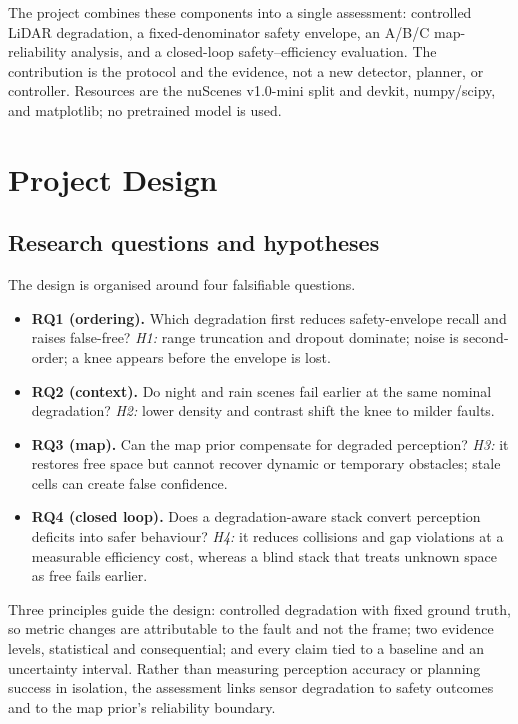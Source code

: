 \documentclass[10pt,a4paper]{article}
\begin{document}
The project combines these components into a single assessment: controlled LiDAR degradation, a fixed-denominator safety envelope, an A/B/C map-reliability analysis, and a closed-loop safety--efficiency evaluation. The contribution is the protocol and the evidence, not a new detector, planner, or controller. Resources are the nuScenes v1.0-mini split and devkit, numpy/scipy, and matplotlib; no pretrained model is used.

\newpage
\suppressfloats[t]
\section{Project Design}

\subsection{Research questions and hypotheses}

The design is organised around four falsifiable questions.

\begin{itemize}
  \item \textbf{RQ1 (ordering).} Which degradation first reduces safety-envelope recall and raises false-free? \emph{H1:} range truncation and dropout dominate; noise is second-order; a knee appears before the envelope is lost.
  \item \textbf{RQ2 (context).} Do night and rain scenes fail earlier at the same nominal degradation? \emph{H2:} lower density and contrast shift the knee to milder faults.
  \item \textbf{RQ3 (map).} Can the map prior compensate for degraded perception? \emph{H3:} it restores free space but cannot recover dynamic or temporary obstacles; stale cells can create false confidence.
  \item \textbf{RQ4 (closed loop).} Does a degradation-aware stack convert perception deficits into safer behaviour? \emph{H4:} it reduces collisions and gap violations at a measurable efficiency cost, whereas a blind stack that treats unknown space as free fails earlier.
\end{itemize}

Three principles guide the design: controlled degradation with fixed ground truth, so metric changes are attributable to the fault and not the frame; two evidence levels, statistical and consequential; and every claim tied to a baseline and an uncertainty interval. Rather than measuring perception accuracy or planning success in isolation, the assessment links sensor degradation to safety outcomes and to the map prior's reliability boundary.
\end{document}
